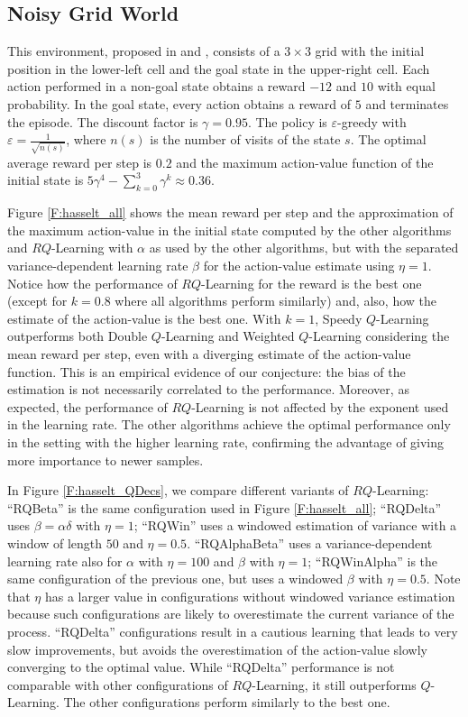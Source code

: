 \subsection{Noisy Grid World}
This environment, proposed in \cite{van2010double}  and \cite{deramo2016estimating}, consists of a $3 \times 3$ grid with the initial position in the lower-left cell and the goal state in the upper-right cell. Each action performed in a non-goal state obtains a reward $-12$ and $10$ with equal probability. In the goal state, every action obtains a reward of $5$ and terminates the episode. The discount factor is $\gamma = 0.95$. The policy is $\varepsilon$-greedy with $\varepsilon = \frac{1}{\sqrt{n(s)}}$, where $n(s)$ is the number of  visits of the state $s$. The optimal average reward per step is $0.2$ and the maximum action-value function of the initial state is $5\gamma^4 - \sum_{k=0}^3 \gamma^k \approx 0.36$.

Figure \ref{F:hasselt_all} shows the mean reward per step and the approximation of the maximum action-value in the initial state computed by the other algorithms and $RQ$-Learning with $\alpha$ as used by the other algorithms, but with the separated variance-dependent learning rate $\beta$ for the action-value estimate using $\eta = 1$. Notice how the performance of $RQ$-Learning for the reward is the best one (except for $k=0.8$ where all algorithms perform similarly) and, also, how the estimate of the action-value is the best one. With $k=1$, Speedy $Q$-Learning outperforms both Double $Q$-Learning and Weighted $Q$-Learning considering the mean reward per step, even with a diverging estimate of the action-value function. This is an empirical evidence of our conjecture: the bias of the estimation is not necessarily correlated to the performance. Moreover, as expected, the performance of $RQ$-Learning is not affected by the exponent used in the learning rate. The other algorithms achieve the optimal performance only in the setting with the higher learning rate, confirming the advantage of giving more importance to newer samples.

In Figure \ref{F:hasselt_QDecs}, we compare different variants of $RQ$-Learning: ``RQBeta'' is the same configuration used in Figure \ref{F:hasselt_all}; ``RQDelta'' uses $\beta = \alpha \delta$ with $\eta = 1$; ``RQWin'' uses a windowed estimation of variance with a window of length $50$ and $\eta = 0.5$. ``RQAlphaBeta'' uses a variance-dependent learning rate also for $\alpha$ with $\eta = 100$ and $\beta$ with $\eta = 1$; ``RQWinAlpha'' is the same configuration of the previous one, but uses a windowed $\beta$ with $\eta = 0.5$. Note that $\eta$ has a larger value in configurations without windowed variance estimation because such configurations are likely to overestimate the current variance of the process. ``RQDelta'' configurations result in a cautious learning that leads to very slow improvements, but avoids the overestimation of the action-value slowly converging to the optimal value. While ``RQDelta'' performance is not comparable with other configurations of $RQ$-Learning, it still outperforms $Q$-Learning. The other configurations perform similarly to the best one.

